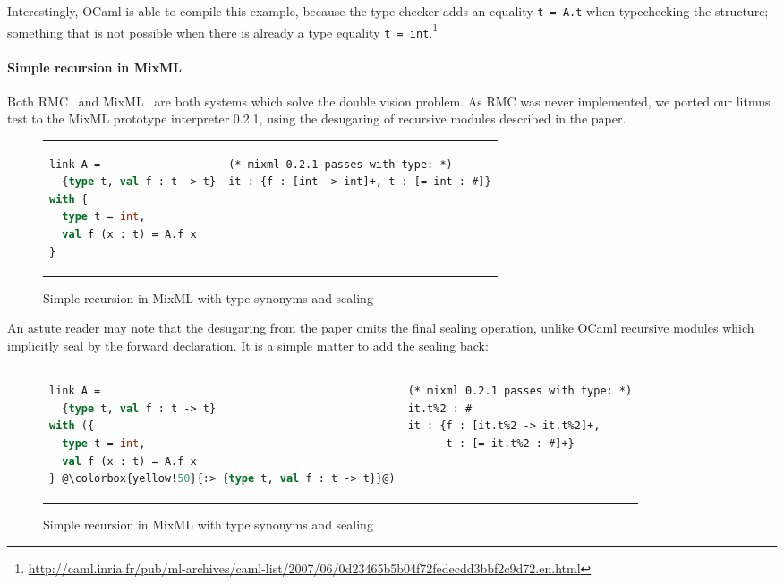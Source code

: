 \noindent
Interestingly, OCaml is able to compile this example, because the type-checker
adds an equality \verb|t = A.t| when typechecking the structure; something that
is not possible when there is already a type equality \verb|t = int|.\footnote{\url{http://caml.inria.fr/pub/ml-archives/caml-list/2007/06/0d23465b5b04f72fedecdd3bbf2c9d72.en.html}}

\paragraph{Simple recursion in MixML}
Both RMC~\cite{dreyer:recursive} and MixML~\cite{rossberg+:mixml} are
both systems which solve the double vision problem.  As RMC was never
implemented, we ported our
litmus test to the MixML prototype interpreter 0.2.1, using the
desugaring of recursive modules described in the paper.

\begin{figure}[H]
\begin{tabular}{p{} p{}}
\begin{lstlisting}[language=ML,escapechar=@]
link A =
  {type t, val f : t -> t}
with {
  type t = int,
  val f (x : t) = A.f x
}
\end{lstlisting}
&
\begin{verbatim}
(* mixml 0.2.1 passes with type: *)
it : {f : [int -> int]+, t : [= int : #]}
\end{verbatim}
\end{tabular}
\caption{Simple recursion in MixML with type synonyms and sealing}
\label{fig:double-vision-simple-recursion-mixml}
\end{figure}

\noindent
An astute reader may note that the desugaring from the paper omits the
final sealing operation, unlike OCaml recursive modules which implicitly
seal by the forward declaration.  It is a simple matter to add the sealing back:

\begin{figure}[H]
\begin{tabular}{p{} p{}}
\begin{lstlisting}[language=ML,escapechar=@]
link A =
  {type t, val f : t -> t}
with ({
  type t = int,
  val f (x : t) = A.f x
} @\colorbox{yellow!50}{:> {type t, val f : t -> t}}@)
\end{lstlisting}
&
\begin{verbatim}
(* mixml 0.2.1 passes with type: *)
it.t%2 : #
it : {f : [it.t%2 -> it.t%2]+,
      t : [= it.t%2 : #]+}
\end{verbatim}
\end{tabular}
\caption{Simple recursion in MixML with type synonyms and sealing}
\label{fig:double-vision-simple-recursion-mixml-sealed}
\end{figure}

